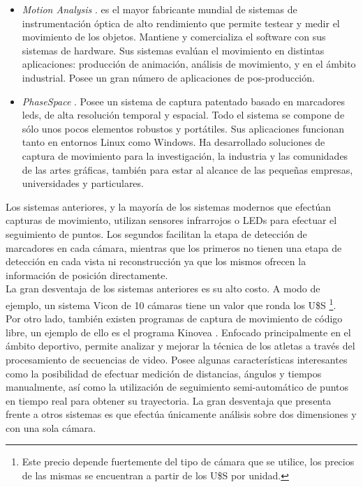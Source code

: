 \begin{itemize}
\item \emph{Motion Analysis} \cite{motion_analysis}. es el mayor fabricante mundial de sistemas de instrumentación óptica de alto rendimiento que permite testear y medir el movimiento de los objetos. Mantiene y comercializa el software con sus sistemas de hardware. Sus sistemas evalúan el movimiento en distintas aplicaciones: producción de animación, análisis de movimiento, y en el ámbito industrial. Posee un gran número de aplicaciones de pos-producción.

\item \emph{PhaseSpace} \cite{phasespace}. Posee un sistema de captura patentado basado en marcadores leds, de alta resolución temporal y espacial. Todo el sistema se compone de sólo unos pocos elementos robustos y portátiles. Sus aplicaciones funcionan tanto en entornos Linux como Windows. Ha desarrollado soluciones de captura de movimiento para la investigación, la industria y las comunidades de las artes gráficas, también para estar al alcance de las pequeñas empresas, universidades y particulares.
\end{itemize}

Los sistemas anteriores, y la mayoría de los sistemas modernos que efectúan capturas de movimiento, utilizan sensores infrarrojos o LEDs para efectuar el seguimiento de puntos. Los segundos facilitan la etapa de detección de marcadores en cada cámara, mientras que los primeros no tienen una etapa de detección en cada vista ni reconstrucción ya que los mismos ofrecen la información de posición directamente.
\\ 

La gran desventaja de los sistemas anteriores es su alto costo. A modo de ejemplo, un sistema Vicon de 10 cámaras tiene un valor que ronda los U\$S \footnote{Este precio depende fuertemente del tipo de cámara que se utilice, los precios de las mismas se encuentran a partir de los U\$S por unidad.}.
\\ 


Por otro lado, también existen programas de captura de movimiento de código libre, un ejemplo de ello es el programa Kinovea \cite{kinovea}. Enfocado principalmente en el ámbito deportivo, permite analizar y mejorar la técnica de los atletas a través del procesamiento de secuencias de video. Posee algunas características interesantes como la posibilidad de efectuar medición de distancias, ángulos y tiempos manualmente, así como la utilización de seguimiento semi-automático de puntos en tiempo real para obtener su trayectoria. La gran desventaja que presenta frente a otros sistemas es que efectúa únicamente análisis sobre dos dimensiones y con una sola cámara.\\

